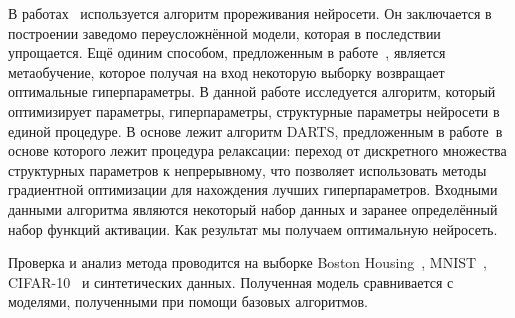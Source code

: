 \documentclass[12pt,twoside]{article}
\begin{document}
	В работах~\cite{cun1990, graves2011} используется алгоритм прореживания нейросети. Он заключается в построении заведомо переусложнённой модели, которая в последствии упрощается. Ещё одиним способом, предложенным в работе~\cite{Maclaurin:2015:GHO:3045118.3045343}, является метаобучение, которое получая на вход некоторую выборку возвращает оптимальные гиперпараметры.
	В данной работе исследуется алгоритм, который оптимизирует параметры, гиперпараметры, структурные параметры нейросети в единой процедуре. В основе лежит алгоритм DARTS, предложенным в работе~\cite{liu2018darts}в основе которого лежит процедура релаксации: переход от дискретного множества структурных параметров к непрерывному, что позволяет использовать методы градиентной оптимизации для нахождения лучших гиперпараметров. Входными данными алгоритма являются некоторый набор данных и заранее определённый набор функций активации. Как результат мы получаем оптимальную нейросеть.
	
	Проверка и анализ метода проводится на выборке Boston Housing~\cite{Boston}, MNIST~\cite{MNIST},  CIFAR-10~\cite{CIFAR-10} и синтетических данных. Полученная модель сравнивается с моделями, полученными при помощи базовых алгоритмов.
	 



\end{document}
